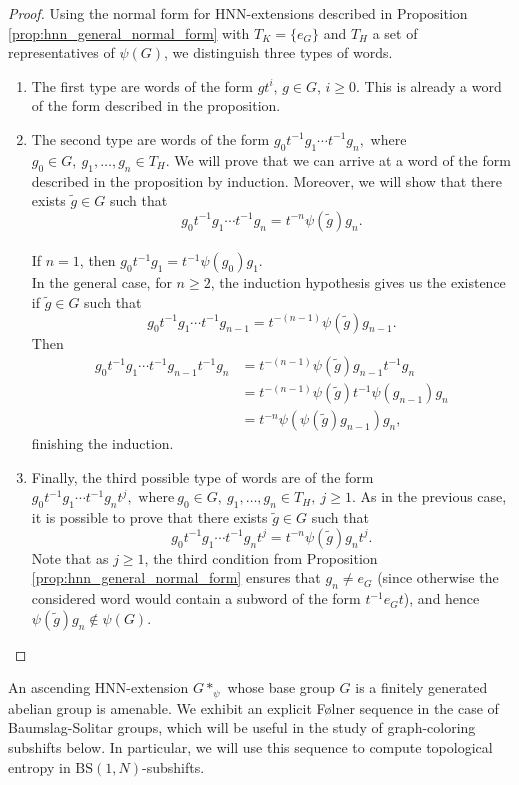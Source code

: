 \documentclass[cupthm,crop,info]{CUP-JNL-ETS}%
\theoremstyle{cupplain}
\theoremstyle{cupdefinition}
\theoremstyle{cupremark}
\theoremstyle{cupproof}
\newtheorem{proof}{Proof}
\numberwithin{equation}{section}
\newcommand{\BS}[1][N]{\mathrm{BS}(1,#1)}
\begin{document}
\begin{proof}
	Using the normal form for HNN-extensions described in Proposition \ref{prop:hnn_general_normal_form} with  $T_K=\{e_{G}\}$ and $T_H$ a set of representatives of $\psi(G)$, we distinguish three types of words.
	\begin{enumerate}[1.]
		\item The first type are words of the form $gt^i$, $g\in G$, $i\ge 0$. This is already a word of the form described in the proposition.
		\item The second type are words of the form $
		g_0t^{-1}g_1\cdots t^{-1}g_n,$ where $ g_0\in G, \ g_1,\ldots,g_n\in T_H.$
		We will prove that we can arrive at a word of the form described in the proposition by induction. Moreover, we will show that there exists $\tilde{g}\in G$ such that
		$$
		g_0t^{-1}g_1\cdots t^{-1}g_n=t^{-n}\psi(\tilde{g})g_n.
		$$\\

		If $n=1$, then $g_0t^{-1}g_1=t^{-1}\psi(g_0)g_1$.\\

		In the general case, for $n\ge 2$, the induction hypothesis gives us the existence if $\tilde{g}\in G$ such that
		$$
		g_0t^{-1}g_1\cdots t^{-1}g_{n-1}=t^{-(n-1)}\psi(\tilde{g})g_{n-1}.
		$$
		Then
		\begin{align*}
		g_0t^{-1}g_1\cdots t^{-1}g_{n-1}t^{-1}g_n&=t^{-(n-1)}\psi(\tilde{g})g_{n-1}t^{-1}g_n\\
		&=t^{-(n-1)}\psi(\tilde{g})t^{-1}\psi(g_{n-1})g_n\\
		&=t^{-n}\psi(\psi(\tilde{g})g_{n-1})g_n,
		\end{align*}
		finishing the induction.
		\item Finally, the third possible type of words are of the form $
		g_0t^{-1}g_1\cdots t^{-1}g_nt^{j}, \text{ where} \ g_0\in G, \ g_1,\ldots,g_n\in T_H, \ j\ge 1.
		$
		As in the previous case, it is possible to prove that there exists $\tilde{g}\in G$ such that
		$$
		g_0t^{-1}g_1\cdots t^{-1}g_nt^{j}=t^{-n}\psi(\tilde{g})g_nt^j.
		$$
		Note that as $j\ge 1$, the third condition from Proposition \ref{prop:hnn_general_normal_form} ensures that $g_n\neq e_G$ (since otherwise the considered word would contain a subword of the form $t^{-1}e_Gt$), and hence $\psi(\tilde{g})g_n\notin \psi(G)$.
	\end{enumerate}
\end{proof}

An ascending HNN-extension $G*_{\psi}$ whose base group $G$ is a finitely generated abelian group is amenable. We exhibit an explicit F\o lner sequence in the case of Baumslag-Solitar groups, which will be useful in the study of graph-coloring subshifts below. In particular, we will use this sequence to compute topological entropy in $\BS$-subshifts.
\end{document}
